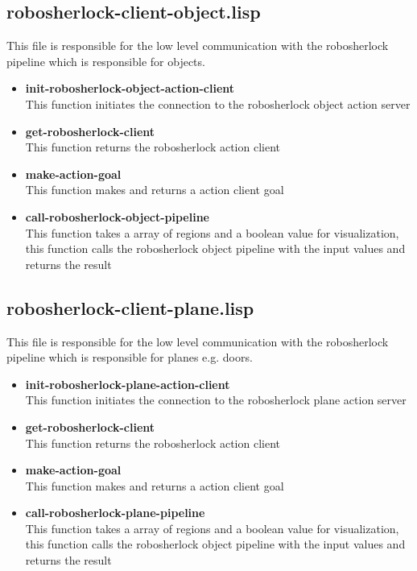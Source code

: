 \documentclass[main.tex]{subfiles}
\begin{document}
		\subsection{robosherlock-client-object.lisp}
		This file is responsible for the low level communication with the robosherlock pipeline which is responsible for objects.
		\begin{itemize}
			\item \textbf{init-robosherlock-object-action-client} \\
			This function initiates the connection to the robosherlock object action server
			\item \textbf{get-robosherlock-client} \\
			This function returns the robosherlock action client
			\item \textbf{make-action-goal} \\
			This function makes and returns a action client goal
			\item \textbf{call-robosherlock-object-pipeline} \\
			This function takes a array of regions and a boolean value for visualization, this function calls the robosherlock object pipeline with the input values and returns the result
		\end{itemize}
		\subsection{robosherlock-client-plane.lisp}
		This file is responsible for the low level communication with the robosherlock pipeline which is responsible for planes e.g. doors.
		\begin{itemize}
			\item \textbf{init-robosherlock-plane-action-client} \\
			This function initiates the connection to the robosherlock plane action server
			\item \textbf{get-robosherlock-client} \\
			This function returns the robosherlock action client
			\item \textbf{make-action-goal} \\
			This function makes and returns a action client goal
			\item \textbf{call-robosherlock-plane-pipeline} \\
			This function takes a array of regions and a boolean value for visualization, this function calls the robosherlock object pipeline with the input values and returns the result
		\end{itemize}
	\endgroup
\end{document}
